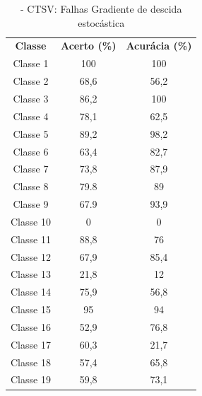 \begin{itemize}
 \begin{table}[ht]
\centering
\begin{tabular}{ccc}
\textbf{Classe} & \textbf{Acerto (\%)} & \textbf{Acurácia (\%)} \\
Classe 1        & 100                  & 100                    \\
Classe 2        & 68,6                  & 56,2                    \\
Classe 3        & 86,2                  & 100                    \\
Classe 4        & 78,1                  & 62,5                    \\
Classe 5        & 89,2                 & 98,2                    \\
Classe 6        & 63,4                  & 82,7                    \\
Classe 7        & 73,8                  & 87,9                    \\
Classe 8        & 79.8                  & 89                    \\
Classe 9        & 67.9                  & 93,9                    \\
Classe 10       & 0                  & 0                    \\
Classe 11       & 88,8            & 76   
     \\
Classe 12       & 67,9                 & 85,4   
     \\
Classe 13      & 21,8                 & 12    
     \\
Classe 14       &  75,9                & 56,8   
     \\
Classe 15       & 95                 & 94
     \\
Classe 16       & 52,9                &    76,8
     \\
Classe 17       & 60,3                & 21,7
     \\
Classe 18     &  57,4              &    65,8 
     \\
Classe 19       & 59,8                 & 73,1                                   
\end{tabular}
\caption{\label{tab:ctsvnGDE}- CTSV: Falhas Gradiente de descida estocástica}
\end{table}


\end{itemize}
